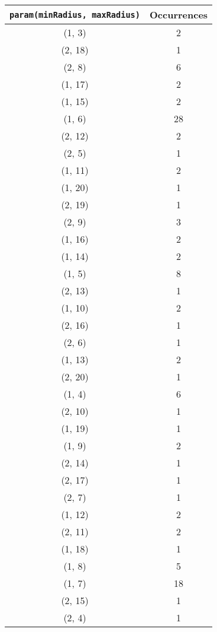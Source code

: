 \documentclass[letterpaper, 12pt]{article}
\begin{document}
\begin{longtable}{|c|c|}
\hline
\textbf{\texttt{param(minRadius, maxRadius)}} & \textbf{Occurrences} \\
\hline
(1, 3) & 2 \\
\hline
(2, 18) & 1 \\
\hline
(2, 8) & 6 \\
\hline
(1, 17) & 2 \\
\hline
(1, 15) & 2 \\
\hline
(1, 6) & 28 \\
\hline
(2, 12) & 2 \\
\hline
(2, 5) & 1 \\
\hline
(1, 11) & 2 \\
\hline
(1, 20) & 1 \\
\hline
(2, 19) & 1 \\
\hline
(2, 9) & 3 \\
\hline
(1, 16) & 2 \\
\hline
(1, 14) & 2 \\
\hline
(1, 5) & 8 \\
\hline
(2, 13) & 1 \\
\hline
(1, 10) & 2 \\
\hline
(2, 16) & 1 \\
\hline
(2, 6) & 1 \\
\hline
(1, 13) & 2 \\
\hline
(2, 20) & 1 \\
\hline
(1, 4) & 6 \\
\hline
(2, 10) & 1 \\
\hline
(1, 19) & 1 \\
\hline
(1, 9) & 2 \\
\hline
(2, 14) & 1 \\
\hline
(2, 17) & 1 \\
\hline
(2, 7) & 1 \\
\hline
(1, 12) & 2 \\
\hline
(2, 11) & 2 \\
\hline
(1, 18) & 1 \\
\hline
(1, 8) & 5 \\
\hline
(1, 7) & 18 \\
\hline
(2, 15) & 1 \\
\hline
(2, 4) & 1 \\
\hline
\end{longtable}
\end{document}
